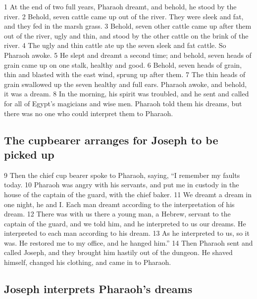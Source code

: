 {1} At the end of two full years, Pharaoh dreamt, and behold, he stood
by the river. {2} Behold, seven cattle came up out of the river. They
were sleek and fat, and they fed in the marsh grass. {3} Behold, seven
other cattle came up after them out of the river, ugly and thin, and
stood by the other cattle on the brink of the river. {4} The ugly and
thin cattle ate up the seven sleek and fat cattle. So Pharaoh awoke. {5}
He slept and dreamt a second time; and behold, seven heads of grain came
up on one stalk, healthy and good. {6} Behold, seven heads of grain,
thin and blasted with the east wind, sprung up after them. {7} The thin
heads of grain swallowed up the seven healthy and full ears. Pharaoh
awoke, and behold, it was a dream. {8} In the morning, his spirit was
troubled, and he sent and called for all of Egypt's magicians and wise
men. Pharaoh told them his dreams, but there was no one who could
interpret them to Pharaoh.

\hypertarget{the-cupbearer-arranges-for-joseph-to-be-picked-up}{%
\subsection{The cupbearer arranges for Joseph to be picked
up}\label{the-cupbearer-arranges-for-joseph-to-be-picked-up}}

{9} Then the chief cup bearer spoke to Pharaoh, saying, ``I remember my
faults today. {10} Pharaoh was angry with his servants, and put me in
custody in the house of the captain of the guard, with the chief baker.
{11} We dreamt a dream in one night, he and I. Each man dreamt according
to the interpretation of his dream. {12} There was with us there a young
man, a Hebrew, servant to the captain of the guard, and we told him, and
he interpreted to us our dreams. He interpreted to each man according to
his dream. {13} As he interpreted to us, so it was. He restored me to my
office, and he hanged him.'' {14} Then Pharaoh sent and called Joseph,
and they brought him hastily out of the dungeon. He shaved himself,
changed his clothing, and came in to Pharaoh.

\hypertarget{joseph-interprets-pharaohs-dreams}{%
\subsection{Joseph interprets Pharaoh's
dreams}\label{joseph-interprets-pharaohs-dreams}}

